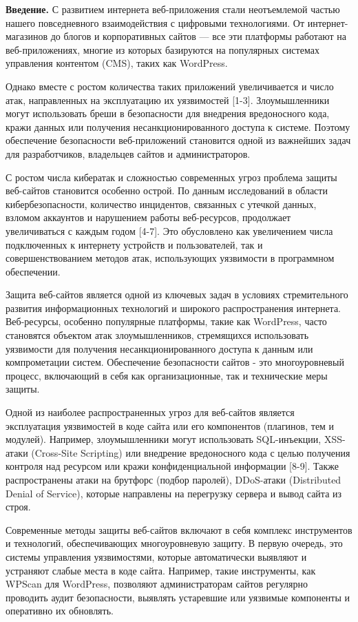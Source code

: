 \begin{multicols}{2}
{\bfseries Введение.} С развитием интернета веб-приложения стали неотъемлемой частью
нашего повседневного взаимодействия с цифровыми технологиями. От
интернет-магазинов до блогов и корпоративных сайтов --- все эти
платформы работают на веб-приложениях, многие из которых базируются на
популярных системах управления контентом (CMS), таких как WordPress.

Однако вместе с ростом количества таких приложений увеличивается и число
атак, направленных на эксплуатацию их уязвимостей {[}1-3{]}.
Злоумышленники могут использовать бреши в безопасности для внедрения
вредоносного кода, кражи данных или получения несанкционированного
доступа к системе. Поэтому обеспечение безопасности веб-приложений
становится одной из важнейших задач для разработчиков, владельцев сайтов
и администраторов.

С ростом числа кибератак и сложностью современных угроз проблема защиты
веб-сайтов становится особенно острой. По данным исследований в области
кибербезопасности, количество инцидентов, связанных с утечкой данных,
взломом аккаунтов и нарушением работы веб-ресурсов, продолжает
увеличиваться с каждым годом {[}4-7{]}. Это обусловлено как увеличением
числа подключенных к интернету устройств и пользователей, так и
совершенствованием методов атак, использующих уязвимости в программном
обеспечении.

Защита веб-сайтов является одной из ключевых задач в условиях
стремительного развития информационных технологий и широкого
распространения интернета. Веб-ресурсы, особенно популярные платформы,
такие как WordPress, часто становятся объектом атак злоумышленников,
стремящихся использовать уязвимости для получения несанкционированного
доступа к данным или компрометации систем. Обеспечение безопасности
сайтов - это многоуровневый процесс, включающий в себя как
организационные, так и технические меры защиты.

Одной из наиболее распространенных угроз для веб-сайтов является
эксплуатация уязвимостей в коде сайта или его компонентов (плагинов, тем
и модулей). Например, злоумышленники могут использовать SQL-инъекции,
XSS-атаки (Cross-Site Scripting) или внедрение вредоносного кода с целью
получения контроля над ресурсом или кражи конфиденциальной информации
{[}8-9{]}. Также распространены атаки на брутфорс (подбор паролей),
DDoS-атаки (Distributed Denial of Service), которые направлены на
перегрузку сервера и вывод сайта из строя.

Современные методы защиты веб-сайтов включают в себя комплекс
инструментов и технологий, обеспечивающих многоуровневую защиту. В
первую очередь, это системы управления уязвимостями, которые
автоматически выявляют и устраняют слабые места в коде сайта. Например,
такие инструменты, как WPScan для WordPress, позволяют администраторам
сайтов регулярно проводить аудит безопасности, выявлять устаревшие или
уязвимые компоненты и оперативно их обновлять.


\end{multicols}
